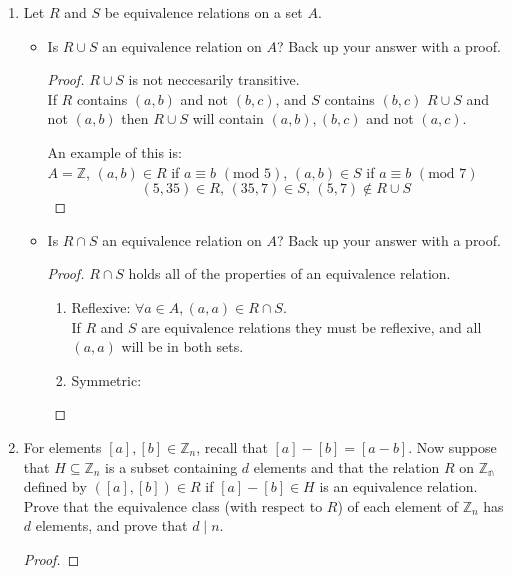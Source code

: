 \documentclass[12pt,a4paper,reqno,parskip=full]{amsart}
\numberwithin{equation}{section}
\theoremstyle{plain}
\theoremstyle{definition}
\begin{document}
\begin{enumerate}
\begin{proof}
        \end{proof}
  \item Let $R$ and $S$ be equivalence relations on a set $A$.
        \begin{itemize}
          \item Is $R\cup S$ an equivalence relation on $A$? Back up your answer with a proof.
                \begin{proof}
                  $R\cup S$ is not neccesarily transitive. \\
                  If $R$ contains $(a,b)$ and not $(b,c)$, and $S$ contains
                  $(b,c)$ $R\cup S$ and not $(a, b)$ then $R\cup S$ will contain
                  $(a,b),(b,c)$ and not $(a,c)$.

                  An example of this is: \\
                  $A=\mathbb{Z}$,
                  $(a,b)\in R$ if $a \equiv b\,\,(\text{mod}\,\,5)$,
                  $(a,b)\in S$ if $a \equiv b\,\,(\text{mod}\,\,7)$
                  \[(5,35)\in R,\,(35,7)\in S,\,(5,7)\notin R\cup S\]
                \end{proof}
          \item Is $R\cap S$ an equivalence relation on $A$? Back up your answer with a proof.
                \begin{proof} $R\cap S$ holds all of the properties of an equivalence relation. \\
                  \begin{enumerate}[i]
                    \item Reflexive: $\forall a\in A,(a,a)\in R\cap S$. \\
                          If $R$ and $S$ are equivalence relations they must be reflexive, and all
                          $(a,a)$ will be in both sets.
                    \item Symmetric:
                  \end{enumerate}
                \end{proof}
        \end{itemize}
  \item For elements $[a],[b]\in\mathbb{Z}_n$, recall that  $[a]-[b]=[a-b]$. Now suppose that
        $H\subseteq\mathbb{Z}_n$ is a subset containing $d$ elements and that the relation $R$ on
        $\mathbb{Z_n}$ defined by $([a],[b])\in R$ if $[a]-[b]\in H$ is an equivalence relation.
        Prove that the equivalence class (with respect to $R$) of each element of $\mathbb{Z}_n$ has
        $d$ elements, and prove that $d\mid n$.
        \begin{proof}

        \end{proof}
\end{enumerate}
\end{document}
